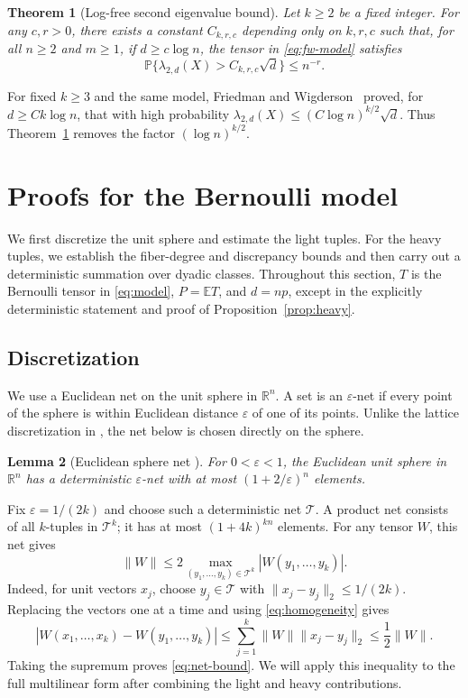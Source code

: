 \documentclass[11pt,reqno]{amsart}
\numberwithin{equation}{section}
\newtheorem{theorem}{Theorem}[section]
\newtheorem{lemma}[theorem]{Lemma}
\theoremstyle{definition}
\theoremstyle{remark}
\newcommand{\E}{\mathbb E}
\newcommand{\Pp}{\mathbb P}
\newcommand{\R}{\mathbb R}
\newcommand{\eps}{\varepsilon}
\begin{document}
\begin{theorem}[Log-free second eigenvalue bound]\label{thm:fw}
Let $k\ge2$ be a fixed integer. For any $c,r>0$, there exists a constant
$C_{k,r,c}$ depending only on $k,r,c$ such that, for all $n\ge2$ and
$m\ge1$, if $ d\ge c\log n$, the tensor in \eqref{eq:fw-model} satisfies
\[
 \Pp\{\lambda_{2,d}(X)>C_{k,r,c}\sqrt d\}\le n^{-r}.
\]
\end{theorem}

For fixed $k\ge3$ and the same  model,
Friedman and Wigderson~\cite[Theorem~1.5]{FW95} proved, for
$d\ge Ck\log n$, that with high probability
 $\lambda_{2,d}(X)\le (C\log n)^{k/2}\sqrt d$.
Thus Theorem~\ref{thm:fw} removes the factor $(\log n)^{k/2}$.




\section{Proofs for the Bernoulli model}\label{sec:proof}

We first discretize the unit sphere and estimate the light tuples.
For the heavy tuples, we establish the fiber-degree and discrepancy
bounds and then carry out a deterministic summation over dyadic
classes. Throughout this section, $T$ is the Bernoulli tensor in
\eqref{eq:model}, $P=\E T$, and $d=np$, except in the explicitly
deterministic statement and proof of Proposition~\ref{prop:heavy}.

\subsection{Discretization}\label{sec:discretization}

We use a Euclidean net on the unit sphere in $\R^n$.
A set is an $\eps$-net if every point of the sphere is within
Euclidean distance $\eps$ of one of its points.
Unlike the lattice discretization in \cite[Section~4.1]{ZZ21},
the net below is chosen directly on the sphere.
\begin{lemma}[Euclidean sphere net {\cite[Corollary~4.2.11]{V26}}]\label{lem:net}
For $0<\eps<1$, the Euclidean unit sphere in $\R^n$ has a deterministic
$\eps$-net with at most $(1+2/\eps)^n$ elements.
\end{lemma}

Fix $\eps=1/(2k)$ and choose such a deterministic net $\mathcal T$.
A product net consists of all $k$-tuples in $\mathcal T^k$;
it has at most $(1+4k)^{kn}$ elements.
For any tensor $W$, this net gives
\begin{equation}\label{eq:net-bound}
 \|W\|\le2\max_{(y_1,\ldots,y_k)\in\mathcal T^k}
                       |W(y_1,\ldots,y_k)|.
\end{equation}
Indeed, for unit vectors $x_j$, choose $y_j\in\mathcal T$ with
$\|x_j-y_j\|_2\le1/(2k)$. Replacing the vectors one at a time and
using \eqref{eq:homogeneity} gives
\[
 |W(x_1,\ldots,x_k)-W(y_1,\ldots,y_k)|
 \le\sum_{j=1}^k\|W\|\|x_j-y_j\|_2
 \le\frac12\|W\|.
\]
Taking the supremum proves \eqref{eq:net-bound}. We will apply this
inequality to the full multilinear form after combining the light
and heavy contributions.
\end{document}
